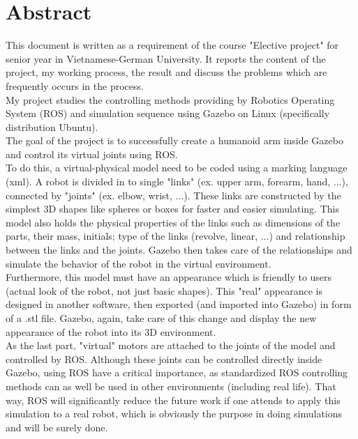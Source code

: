 \documentclass[pdftex,12pt,a4paper]{article}
\begin{document}
  
  
  
  \newpage
  \tableofcontents
  \listoffigures
  
  \newpage
  \section*{Abstract}
  This document is written as a requirement of the course "Elective project" for senior year in Vietnamese-German University. It reports the content of the project, my working process, the result and discuss the problems which are frequently occurs in the process.\\
  My project studies the controlling methods providing by Robotics Operating System (ROS) and simulation sequence using Gazebo on Linux (specifically distribution Ubuntu). \\
  The goal of the project is to successfully create a humanoid arm inside Gazebo and control its virtual joints using ROS.\\
  To do this, a virtual-physical model need to be coded using a marking language (xml). A robot is divided in to single "links" (ex. upper arm, forearm, hand, ...), connected by "joints" (ex. elbow, wrist, ...). These links are constructed by the simplest 3D shapes like spheres or boxes for faster and easier simulating. This model also holds the physical properties of the links such as dimensions of the parts, their mass, initials; type of the links (revolve, linear, ...) and relationship between the links and the joints. Gazebo then takes care of the relationships and simulate the behavior of the robot in the virtual environment.\\
  Furthermore, this model must have an appearance which is friendly to users (actual look of the robot, not just basic shapes). This "real" appearance is designed in another software, then exported (and imported into Gazebo) in form of a .stl file. Gazebo, again, take care of this change and display the new appearance of the robot into its 3D environment. \\
  As the last part, "virtual" motors are attached to the joints of the model and controlled by ROS. Although these joints can be controlled directly inside Gazebo, using ROS have a critical importance, as standardized ROS controlling methods can as well be used in other environments (including real life). That way, ROS will significantly reduce the future work if one attends to apply this simulation to a real robot, which is obviously the purpose in doing simulations and will be surely done.\\
  
\end{document}
